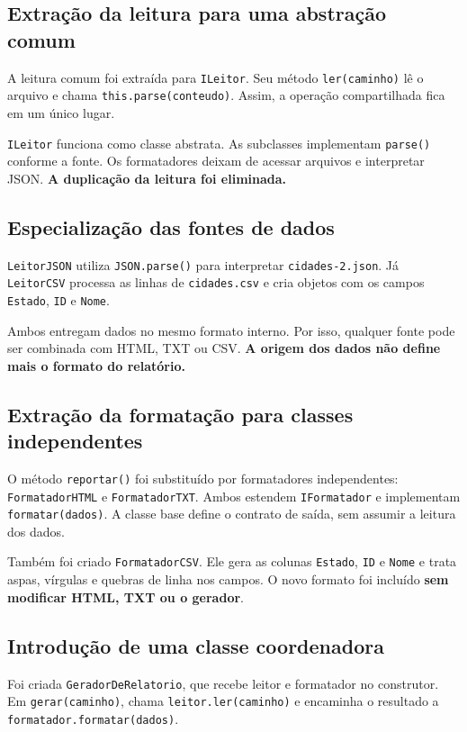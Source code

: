 \documentclass[12pt,a4paper]{article}
\begin{document}
\subsection{Extração da leitura para uma abstração comum}
A leitura comum foi extraída para \texttt{ILeitor}. Seu método \texttt{ler(caminho)} lê o arquivo e chama \texttt{this.parse(conteudo)}. Assim, a operação compartilhada fica em um único lugar.

\texttt{ILeitor} funciona como classe abstrata. As subclasses implementam \texttt{parse()} conforme a fonte. Os formatadores deixam de acessar arquivos e interpretar JSON. \textbf{A duplicação da leitura foi eliminada.}

\subsection{Especialização das fontes de dados}
\texttt{LeitorJSON} utiliza \texttt{JSON.parse()} para interpretar \texttt{cidades-2.json}. Já \texttt{LeitorCSV} processa as linhas de \texttt{cidades.csv} e cria objetos com os campos \texttt{Estado}, \texttt{ID} e \texttt{Nome}.

Ambos entregam dados no mesmo formato interno. Por isso, qualquer fonte pode ser combinada com HTML, TXT ou CSV. \textbf{A origem dos dados não define mais o formato do relatório.}

\subsection{Extração da formatação para classes independentes}
O método \texttt{reportar()} foi substituído por formatadores independentes: \texttt{FormatadorHTML} e \texttt{FormatadorTXT}. Ambos estendem \texttt{IFormatador} e implementam \texttt{formatar(dados)}. A classe base define o contrato de saída, sem assumir a leitura dos dados.

Também foi criado \texttt{FormatadorCSV}. Ele gera as colunas \texttt{Estado}, \texttt{ID} e \texttt{Nome} e trata aspas, vírgulas e quebras de linha nos campos. O novo formato foi incluído \textbf{sem modificar HTML, TXT ou o gerador}.

\subsection{Introdução de uma classe coordenadora}
Foi criada \texttt{GeradorDeRelatorio}, que recebe leitor e formatador no construtor. Em \texttt{gerar(caminho)}, chama \texttt{leitor.ler(caminho)} e encaminha o resultado a \texttt{formatador.formatar(dados)}.
\end{document}
